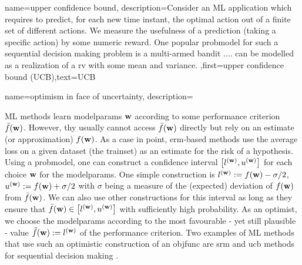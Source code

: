 {name={upper confidence bound},
	description={Consider an ML application which requires 
		to predict, for each new time instant, the optimal action out of a finite set of different actions. We measure the usefulness 
		of a \gls{prediction} (taking a specific action) by some numeric reward. One popular \gls{probmodel} 
		for such a sequential decision making problem is a multi-armed bandit $\ldots$.
		can be modelled as a realization of a \gls{rv} with some mean and variance. },first={upper confidence bound (UCB)},text={UCB} 
}


{name={optimism in face of uncertainty},
	description={ML  methods learn \gls{modelparams} ${\bf w}$ 
		according to some performance criterion $\bar{f}({\bf w})$. However, thy usually 
		cannot access $\bar{f}({\bf w})$ directly but rely on an estimate (or approximation) $f({\bf w})$. 
		As a case in point, \gls{erm}-based methods use the average \gls{loss} on a given \gls{dataset} (the \gls{trainset}) 
		as an estimate for the \gls{risk} of a \gls{hypothesis}. Using a \gls{probmodel}, one can construct 
		a confidence interval 
	$\big[ l^{({\bf w})},  u^{({\bf w})} \big]$ for each choice ${\bf w}$ for the \gls{modelparams}.
	One simple construction is $l^{({\bf w})} := f({\bf w}) - \sigma/2$, $u^{({\bf w})} := f({\bf w})+ \sigma/2$ 
	with $\sigma$ being a measure of the (expected) deviation of $f({\bf w})$ from $\bar{f}({\bf w})$. 
	We can also use other constructions for this interval as long as they ensure that $\bar{f}({\bf w}) \in\big[ l^{({\bf w})},  u^{({\bf w})} \big]$ 
	with sufficiently high probability. As an optimist, we choose the \gls{modelparams} 
	according to the most favourable - yet still plausible - value $\tilde{f}({\bf w}) :=  l^{({\bf w})}$ of the performance criterion. 
	Two examples of ML methods that use such an optimistic construction of an \gls{objfunc} 
	are \gls{srm} \cite[Ch. 11]{ShalevMLBook} and \gls{ucb} methods for sequential decision making \cite[Sec. 2.2]{Bubeck2012}. 
		\begin{figure}[htbp]
				\begin{center}
\end{center}
\end{figure}}}
